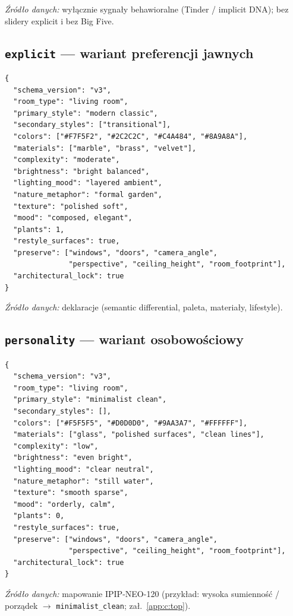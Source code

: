 \noindent\textit{Źródło danych:} wyłącznie sygnały behawioralne (Tinder / implicit DNA); bez slidery explicit i bez Big Five.

\subsection{\texttt{explicit} --- wariant preferencji jawnych}
\label{app:d:sec:explicit}

\begin{lstlisting}
{
  "schema_version": "v3",
  "room_type": "living room",
  "primary_style": "modern classic",
  "secondary_styles": ["transitional"],
  "colors": ["#F7F5F2", "#2C2C2C", "#C4A484", "#8A9A8A"],
  "materials": ["marble", "brass", "velvet"],
  "complexity": "moderate",
  "brightness": "bright balanced",
  "lighting_mood": "layered ambient",
  "nature_metaphor": "formal garden",
  "texture": "polished soft",
  "mood": "composed, elegant",
  "plants": 1,
  "restyle_surfaces": true,
  "preserve": ["windows", "doors", "camera_angle",
               "perspective", "ceiling_height", "room_footprint"],
  "architectural_lock": true
}
\end{lstlisting}

\noindent\textit{Źródło danych:} deklaracje (semantic differential, paleta, materiały, lifestyle).

\subsection{\texttt{personality} --- wariant osobowościowy}
\label{app:d:sec:personality}

\begin{lstlisting}
{
  "schema_version": "v3",
  "room_type": "living room",
  "primary_style": "minimalist clean",
  "secondary_styles": [],
  "colors": ["#F5F5F5", "#D0D0D0", "#9AA3A7", "#FFFFFF"],
  "materials": ["glass", "polished surfaces", "clean lines"],
  "complexity": "low",
  "brightness": "even bright",
  "lighting_mood": "clear neutral",
  "nature_metaphor": "still water",
  "texture": "smooth sparse",
  "mood": "orderly, calm",
  "plants": 0,
  "restyle_surfaces": true,
  "preserve": ["windows", "doors", "camera_angle",
               "perspective", "ceiling_height", "room_footprint"],
  "architectural_lock": true
}
\end{lstlisting}

\noindent\textit{Źródło danych:} mapowanie IPIP-NEO-120 (przykład: wysoka sumienność / porządek $\rightarrow$ \texttt{minimalist\_clean}; zał.~\ref{app:c:top}).

